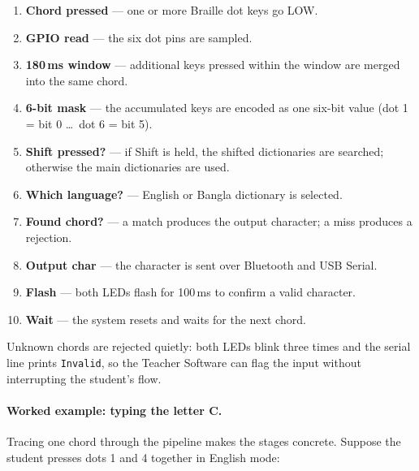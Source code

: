 \documentclass[11pt,a4paper,twoside]{article}
\begin{document}
\begin{enumerate}[nosep]
  \item \textbf{Chord pressed} --- one or more Braille dot keys go LOW.
  \item \textbf{GPIO read} --- the six dot pins are sampled.
  \item \textbf{180\,ms window} --- additional keys pressed within the
    window are merged into the same chord.
  \item \textbf{6-bit mask} --- the accumulated keys are encoded as one
    six-bit value (dot 1 = bit 0 \ldots\ dot 6 = bit 5).
  \item \textbf{Shift pressed?} --- if Shift is held, the shifted
    dictionaries are searched; otherwise the main dictionaries are used.
  \item \textbf{Which language?} --- English or Bangla dictionary is
    selected.
  \item \textbf{Found chord?} --- a match produces the output character;
    a miss produces a rejection.
  \item \textbf{Output char} --- the character is sent over Bluetooth and
    USB Serial.
  \item \textbf{Flash} --- both LEDs flash for 100\,ms to confirm a valid
    character.
  \item \textbf{Wait} --- the system resets and waits for the next chord.
\end{enumerate}

Unknown chords are rejected quietly: both LEDs blink three times and the
serial line prints \texttt{Invalid}, so the Teacher Software can flag the
input without interrupting the student's flow.

\paragraph{Worked example: typing the letter C.}
Tracing one chord through the pipeline makes the stages concrete.
Suppose the student presses dots 1 and 4 together in English mode:
\end{document}
